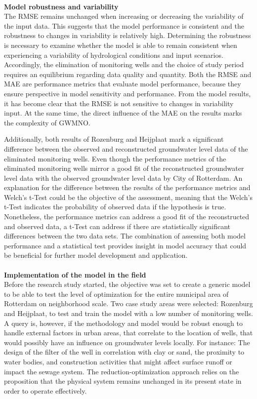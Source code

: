 \\
\textbf{Model robustness and variability}\\
The RMSE remains unchanged when increasing or decreasing the variability of the input data. This suggests that the model performance is consistent and the robustness to changes in variability is relatively high. Determining the robustness is necessary to examine whether the model is able to remain consistent when experiencing a variability of hydrological conditions and input scenarios. Accordingly, the elimination of monitoring wells and the choice of study period requires an equilibrium regarding data quality and quantity. Both the RMSE and MAE are performance metrics that evaluate model performance, because they ensure perspective in model sensitivity and performance. From the model results, it has become clear that the RMSE is not sensitive to changes in variability input. At the same time, the direct influence of the MAE on the results marks the complexity of GWMNO. 

Additionally, both results of Rozenburg and Heijplaat mark a significant difference between the observed and reconstructed groundwater level data of the eliminated monitoring wells. Even though the performance metrics of the eliminated monitoring wells mirror a good fit of the reconstructed groundwater level data with the observed groundwater level data by City of Rotterdam. An explanation for the difference between the results of the performance metrics and Welch's t-Test could be the objective of the assessment, meaning that the Welch's t-Test indicates the probability of observed data if the hypothesis is true. Nonetheless, the performance metrics can address a good fit of the reconstructed and observed data, a t-Test can address if there are statistically significant differences between the two data sets. The combination of assessing both model performance and a statistical test provides insight in model accuracy that could be beneficial for further model development and application. \\
\\
\noindent
\textbf{Implementation of the model in the field}\\
Before the research study started, the objective was set to create a generic model to be able to test the level of optimization for the entire municipal area of Rotterdam on neighborhood scale. Two case study areas were selected: Rozenburg and Heijplaat, to test and train the model with a low number of monitoring wells. A query is, however, if the methodology and model would be robust enough to handle external factors in urban areas, that correlate to the location of wells, that would possibly have an influence on groundwater levels locally. For instance: The design of the filter of the well in correlation with clay or sand, the proximity to water bodies, and construction activities that might affect surface runoff or impact the sewage system. The reduction-optimization approach relies on the proposition that the physical system remains unchanged in its present state in order to operate effectively. 






